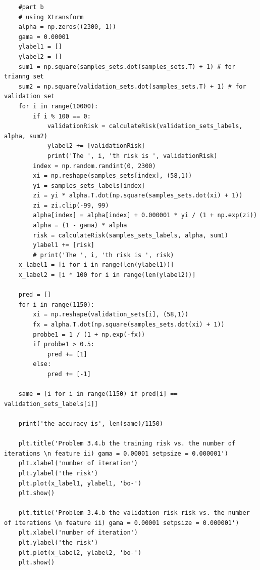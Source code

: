 \documentclass[11pt]{article}
\begin{document}
\begin{lstlisting}
	#part b
	# using Xtransform
	alpha = np.zeros((2300, 1))
	gama = 0.00001
	ylabel1 = []
	ylabel2 = []
	sum1 = np.square(samples_sets.dot(samples_sets.T) + 1) # for trianng set
	sum2 = np.square(validation_sets.dot(samples_sets.T) + 1) # for validation set
	for i in range(10000):
		if i % 100 == 0:
			validationRisk = calculateRisk(validation_sets_labels, alpha, sum2)
			ylabel2 += [validationRisk]
			print('The ', i, 'th risk is ', validationRisk)
		index = np.random.randint(0, 2300)	
		xi = np.reshape(samples_sets[index], (58,1))
		yi = samples_sets_labels[index]
		zi = yi * alpha.T.dot(np.square(samples_sets.dot(xi) + 1))
		zi = zi.clip(-99, 99)
		alpha[index] = alpha[index] + 0.000001 * yi / (1 + np.exp(zi))
		alpha = (1 - gama) * alpha
		risk = calculateRisk(samples_sets_labels, alpha, sum1)
		ylabel1 += [risk]
		# print('The ', i, 'th risk is ', risk)
	x_label1 = [i for i in range(len(ylabel1))]
	x_label2 = [i * 100 for i in range(len(ylabel2))]

	pred = []
	for i in range(1150):
		xi = np.reshape(validation_sets[i], (58,1))
		fx = alpha.T.dot(np.square(samples_sets.dot(xi) + 1))
		probbe1 = 1 / (1 + np.exp(-fx))
		if probbe1 > 0.5:
			pred += [1]
		else:
			pred += [-1]

	same = [i for i in range(1150) if pred[i] == validation_sets_labels[i]]

	print('the accuracy is', len(same)/1150)

	plt.title('Problem 3.4.b the training risk vs. the number of iterations \n feature ii) gama = 0.00001 setpsize = 0.000001')
	plt.xlabel('number of iteration')
	plt.ylabel('the risk')
	plt.plot(x_label1, ylabel1, 'bo-')
	plt.show()

	plt.title('Problem 3.4.b the validation risk risk vs. the number of iterations \n feature ii) gama = 0.00001 setpsize = 0.000001')
	plt.xlabel('number of iteration')
	plt.ylabel('the risk')
	plt.plot(x_label2, ylabel2, 'bo-')
	plt.show()



\end{lstlisting}
\end{document}
